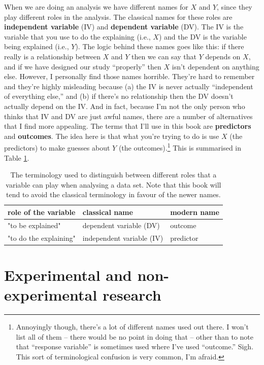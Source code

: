 \documentclass[
]{book}
\begin{document}
When we are doing an analysis we have different names for \(X\) and \(Y\), since they play different roles in the analysis. The classical names for these roles are {\textbf{independent variable}} (IV) and {\textbf{dependent variable}} (DV). The IV is the variable that you use to do the explaining (i.e., \(X\)) and the DV is the variable being explained (i.e., \(Y\)). The logic behind these names goes like this: if there really is a relationship between \(X\) and \(Y\) then we can say that \(Y\) depends on \(X\), and if we have designed our study ``properly'' then \(X\) isn't dependent on anything else. However, I personally find those names horrible. They're hard to remember and they're highly misleading because (a) the IV is never actually ``independent of everything else,'' and (b) if there's no relationship then the DV doesn't actually depend on the IV. And in fact, because I'm not the only person who thinks that IV and DV are just awful names, there are a number of alternatives that I find more appealing. The terms that I'll use in this book are {\textbf{predictors}} and {\textbf{outcomes}}. The idea here is that what you're trying to do is use \(X\) (the predictors) to make guesses about \(Y\) (the outcomes).\footnote{Annoyingly though, there's a lot of different names used out there. I won't list all of them -- there would be no point in doing that -- other than to note that ``response variable'' is sometimes used where I've used ``outcome.'' Sigh. This sort of terminological confusion is very common, I'm afraid.} This is summarised in Table \ref{tab:ivdv}.

\begin{table}

\caption{\label{tab:ivdv}The terminology used to distinguish between different roles that a variable can play when analysing a data set. Note that this book will tend to avoid the classical terminology in favour of the newer names.}
\centering
\begin{tabular}[t]{lll}
\toprule
role of the variable & classical name & modern name\\
\midrule
"to be explained" & dependent variable (DV) & outcome\\
"to do the explaining" & independent variable (IV) & predictor\\
\bottomrule
\end{tabular}
\end{table}

\hypertarget{researchdesigns}{%
\section{Experimental and non-experimental research}\label{researchdesigns}}
\end{document}
